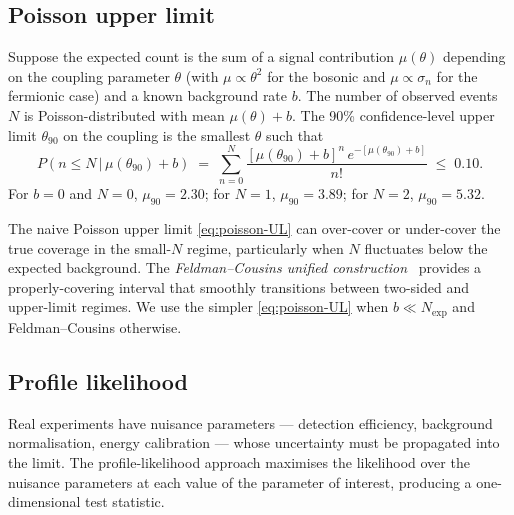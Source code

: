\subsection{Poisson upper limit}
\label{sec:poisson-limit}

\begin{statement}
\label{stmt:poisson-UL}
Suppose the expected count is the sum of a signal contribution
$\mu(\theta)$ depending on the coupling parameter $\theta$ (with
$\mu\propto\theta^2$ for the bosonic and $\mu\propto\sigma_n$ for
the fermionic case) and a known background rate $b$. The number of
observed events $N$ is Poisson-distributed with mean
$\mu(\theta)+b$. The 90\% confidence-level upper limit
$\theta_{90}$ on the coupling is the smallest $\theta$ such that
\begin{equation}
\label{eq:poisson-UL}
P(n\leq N \,|\,\mu(\theta_{90})+b)
\;=\;\sum_{n=0}^{N}\frac{[\mu(\theta_{90})+b]^n\,e^{-[\mu(\theta_{90})+b]}}{n!}
\;\leq\; 0.10.
\end{equation}
For $b=0$ and $N=0$, $\mu_{90}=2.30$; for $N=1$, $\mu_{90}=3.89$;
for $N=2$, $\mu_{90}=5.32$.
\end{statement}

\begin{remark}
The naive Poisson upper limit \cref{eq:poisson-UL} can over-cover
or under-cover the true coverage in the small-$N$ regime,
particularly when $N$ fluctuates below the expected background. The
\emph{Feldman--Cousins unified construction}~\cite{feldman1998}
provides a properly-covering interval that smoothly transitions
between two-sided and upper-limit regimes. We use the simpler
\cref{eq:poisson-UL} when $b\ll N_\text{exp}$ and Feldman--Cousins
otherwise.
\end{remark}

\subsection{Profile likelihood}
\label{sec:profile-likelihood}

\begin{phenomenon}
Real experiments have nuisance parameters --- detection efficiency,
background normalisation, energy calibration --- whose uncertainty
must be propagated into the limit. The profile-likelihood approach
maximises the likelihood over the nuisance parameters at each value
of the parameter of interest, producing a one-dimensional test
statistic.
\end{phenomenon}

